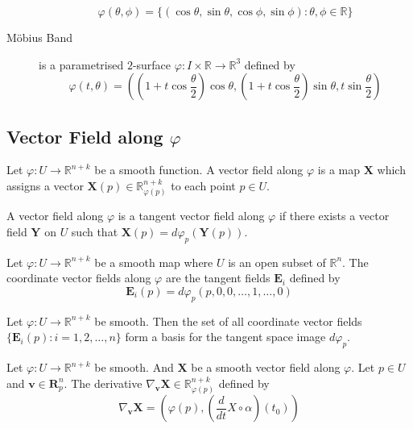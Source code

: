 \begin{description}
	\begin{equation}
		\varphi(\theta,\phi) = \{ (\cos \theta,\sin \theta,\cos \phi,\sin \phi) : \theta,\phi \in \mathbb{R} \}
	\end{equation}
\item[M\"obius Band] is a parametrised $2$-surface $\varphi : I \times \mathbb{R} \to \mathbb{R}^3$ defined by
	\begin{equation}
		\varphi(t,\theta) = \left( \left(1+t \cos \frac{\theta}{2}\right)\cos \theta, \left( 1+t \cos \frac{\theta}{2}\right) \sin \theta, t \sin\frac{\theta}{2} \right)
	\end{equation}
\end{description}

\subsection{Vector Field along $\varphi$}
\begin{definition}
	Let $\varphi : U \to \mathbb{R}^{n+k}$ be a smooth function. A vector field along $\varphi$ is a map $\mathbf{X}$ which assigns a vector $\mathbf{X}(p) \in \mathbb{R}_{\varphi(p)}^{n+k}$ to each point $p \in U$.
\end{definition}

\begin{definition}
	A vector field along $\varphi$ is a tangent vector field along $\varphi$ if there exists a vector field $\mathbf{Y}$ on $U$ such that $\mathbf{X}(p) = d\varphi_p(\mathbf{Y}(p))$.
\end{definition}

\begin{definition}
	Let $\varphi : U \to \mathbb{R}^{n+k}$ be a smooth map where $U$ is an open subset of $\mathbb{R}^n$. The coordinate vector fields along $\varphi$ are the tangent fields $\mathbf{E}_i$ defined by
	\begin{equation}
		\mathbf{E}_i(p) = d\varphi_p(p,0,0,\dots,1,\dots,0)
	\end{equation}
\end{definition}

\begin{theorem}
	Let $\varphi : U \to \mathbb{R}^{n+k}$ be smooth. Then the set of all coordinate vector fields $\{ \mathbf{E}_i(p) : i = 1,2,\dots,n \}$ form a basis for the tangent space image $d\varphi_p$.
\end{theorem}

\begin{definition}
	Let $\varphi : U \to \mathbb{R}^{n+k}$ be smooth. And $\mathbf{X}$ be a smooth vector field along $\varphi$. Let $p \in U$ and $\mathbf{v} \in \mathbf{R}_p^n$. The derivative $\nabla_\mathbf{v} \mathbf{X} \in \mathbb{R}_{\varphi(p)}^{n+k}$ defined by
\begin{equation}
	\nabla_\mathbf{v} \mathbf{X} = \left( \varphi(p), \left( \frac{d}{dt} X \circ \alpha \right) (t_0) \right)
\end{equation}
\end{definition}

